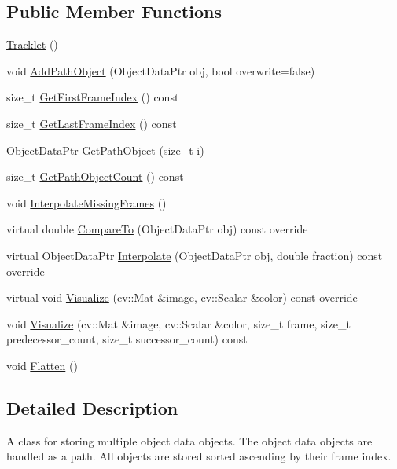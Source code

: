 \subsection*{Public Member Functions}
\begin{DoxyCompactItemize}
\item 
\hyperlink{classcore_1_1Tracklet_aedf59b5a9a068a28bb7570f2a031d4e7}{Tracklet} ()
\item 
void \hyperlink{classcore_1_1Tracklet_ab0b397f2d0685a927de886dbd36c3bc8}{Add\+Path\+Object} (Object\+Data\+Ptr obj, bool overwrite=false)
\item 
size\+\_\+t \hyperlink{classcore_1_1Tracklet_a1b963319d6c65614baec02a925f31691}{Get\+First\+Frame\+Index} () const
\item 
size\+\_\+t \hyperlink{classcore_1_1Tracklet_ad8e195b523cf2021394455cc21867d96}{Get\+Last\+Frame\+Index} () const
\item 
Object\+Data\+Ptr \hyperlink{classcore_1_1Tracklet_a9758349e8f25c479ffc4b21a90149a81}{Get\+Path\+Object} (size\+\_\+t i)
\item 
size\+\_\+t \hyperlink{classcore_1_1Tracklet_aee4298a7b734b2b7533d4536006a8aa8}{Get\+Path\+Object\+Count} () const
\item 
void \hyperlink{classcore_1_1Tracklet_a10b56b608b24ef547550540e5a755bce}{Interpolate\+Missing\+Frames} ()
\item 
virtual double \hyperlink{classcore_1_1Tracklet_a0357f2fa173941800571432dcbc96dc2}{Compare\+To} (Object\+Data\+Ptr obj) const override
\item 
virtual Object\+Data\+Ptr \hyperlink{classcore_1_1Tracklet_a5fb5e6ab9df668c3477e8b52f115b188}{Interpolate} (Object\+Data\+Ptr obj, double fraction) const override
\item 
virtual void \hyperlink{classcore_1_1Tracklet_a85f92a4059bf89f24a83f28935675181}{Visualize} (cv\+::\+Mat \&image, cv\+::\+Scalar \&color) const override
\item 
void \hyperlink{classcore_1_1Tracklet_a3a2b241939559e47aef701d2e2c4d4bd}{Visualize} (cv\+::\+Mat \&image, cv\+::\+Scalar \&color, size\+\_\+t frame, size\+\_\+t predecessor\+\_\+count, size\+\_\+t successor\+\_\+count) const
\item 
void \hyperlink{classcore_1_1Tracklet_a2bdb2f2c8249145808e7029dde6e7df0}{Flatten} ()
\end{DoxyCompactItemize}


\subsection{Detailed Description}
A class for storing multiple object data objects. The object data objects are handled as a path. All objects are stored sorted ascending by their frame index. 

